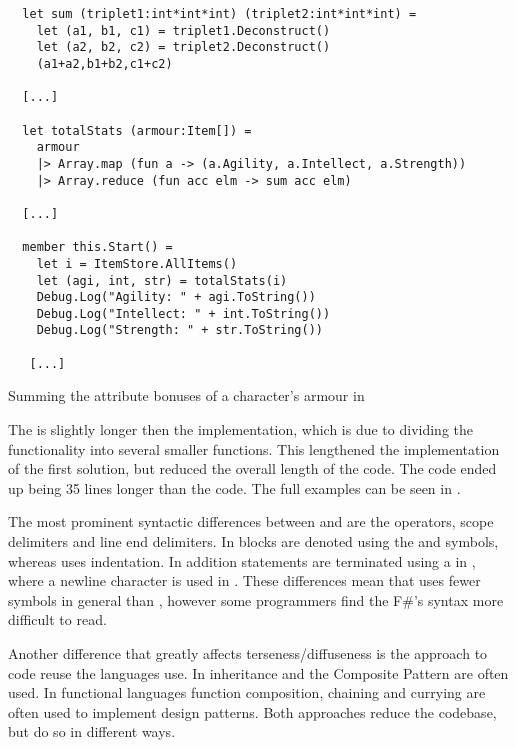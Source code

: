 \begin{listing}[H]
  \begin{verbatim}
  let sum (triplet1:int*int*int) (triplet2:int*int*int) =
    let (a1, b1, c1) = triplet1.Deconstruct()
    let (a2, b2, c2) = triplet2.Deconstruct()
    (a1+a2,b1+b2,c1+c2)
  
  [...]
  
  let totalStats (armour:Item[]) =
    armour
    |> Array.map (fun a -> (a.Agility, a.Intellect, a.Strength))
    |> Array.reduce (fun acc elm -> sum acc elm)
  
  [...]
  
  member this.Start() =
    let i = ItemStore.AllItems()
    let (agi, int, str) = totalStats(i)
    Debug.Log("Agility: " + agi.ToString())
    Debug.Log("Intellect: " + int.ToString())
    Debug.Log("Strength: " + str.ToString())
  
   [...]
  \end{verbatim}
  \caption{Summing the attribute bonuses of a character's armour in \fs}
  \label{lst:fs-armour}
  \end{listing}

The \fs is slightly longer then the \cs implementation, which is due to dividing the functionality into several smaller functions. This lengthened the implementation of the first solution, but reduced the overall length of the code. The \cs code ended up being 35 lines longer than the \fs code. The full examples can be seen in .

The most prominent syntactic differences between \cs and \fs are the operators, scope delimiters and line end delimiters. In \cs blocks are denoted using the \m{\{} and \m{\}} symbols, whereas \fs uses indentation. In addition statements are terminated using a \m{;} in \cs, where a newline character is used in \fs. These differences mean that \fs uses fewer symbols in general than \cs, however some programmers find the F\#'s syntax more difficult to read\cite{fsharp:light:love}.

Another difference that greatly affects terseness/diffuseness is the approach to code reuse the languages use. In \cs inheritance and the Composite Pattern\cite{composite:pattern} are often used\cite{csharp:composite:pattern}. In functional languages function composition, chaining and currying are often used to implement design patterns\cite{functional:design:patterns}. Both approaches reduce the codebase, but do so in different ways.
